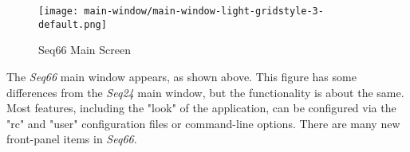 \documentclass[
 11pt,
 twoside,
 a4paper,
 headinclude,
 footinclude,
 final                                 %
]{article}
\begin{document}
\begin{figure}[H]
   \centering 
   \texttt{[image: main-window/main-window-light-gridstyle-3-default.png]}
   \caption{Seq66 Main Screen}
   \label{fig:seq66_main_screen}
\end{figure}

   The \textsl{Seq66} main window appears, as shown above.
   This figure has some differences from the \textsl{Seq24} main window,
   but the functionality is about the same.
   Most features, including the "look" of the application,
   can be configured via the "rc" and "user"
   configuration files or command-line options.
   There are many new front-panel items in \textsl{Seq66}.

\end{document}
